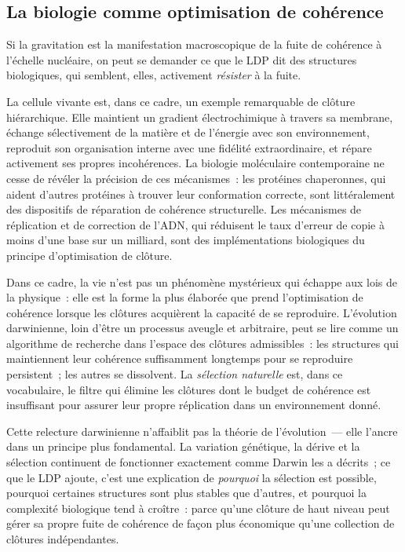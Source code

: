 \documentclass[12pt, a4paper, openright]{book}
\begin{document}
\subsection*{La biologie comme optimisation de cohérence}

Si la gravitation est la manifestation macroscopique de la fuite de cohérence à l'échelle nucléaire, on peut se demander ce que le LDP dit des structures biologiques, qui semblent, elles, activement \emph{résister} à la fuite.

\medskip

La cellule vivante est, dans ce cadre, un exemple remarquable de clôture hiérarchique. Elle maintient un gradient électrochimique à travers sa membrane, échange sélectivement de la matière et de l'énergie avec son environnement, reproduit son organisation interne avec une fidélité extraordinaire, et répare activement ses propres incohérences. La biologie moléculaire contemporaine ne cesse de révéler la précision de ces mécanismes~: les protéines chaperonnes, qui aident d'autres protéines à trouver leur conformation correcte, sont littéralement des dispositifs de réparation de cohérence structurelle. Les mécanismes de réplication et de correction de l'ADN, qui réduisent le taux d'erreur de copie à moins d'une base sur un milliard, sont des implémentations biologiques du principe d'optimisation de clôture.

\medskip

Dans ce cadre, la vie n'est pas un phénomène mystérieux qui échappe aux lois de la physique~: elle est la forme la plus élaborée que prend l'optimisation de cohérence lorsque les clôtures acquièrent la capacité de se reproduire. L'évolution darwinienne, loin d'être un processus aveugle et arbitraire, peut se lire comme un algorithme de recherche dans l'espace des clôtures admissibles~: les structures qui maintiennent leur cohérence suffisamment longtemps pour se reproduire persistent~; les autres se dissolvent. La \emph{sélection naturelle} est, dans ce vocabulaire, le filtre qui élimine les clôtures dont le budget de cohérence est insuffisant pour assurer leur propre réplication dans un environnement donné.

\medskip

Cette relecture darwinienne n'affaiblit pas la théorie de l'évolution~--- elle l'ancre dans un principe plus fondamental. La variation génétique, la dérive et la sélection continuent de fonctionner exactement comme Darwin les a décrits~; ce que le LDP ajoute, c'est une explication de \emph{pourquoi} la sélection est possible, pourquoi certaines structures sont plus stables que d'autres, et pourquoi la complexité biologique tend à croître~: parce qu'une clôture de haut niveau peut gérer sa propre fuite de cohérence de façon plus économique qu'une collection de clôtures indépendantes.
\end{document}
